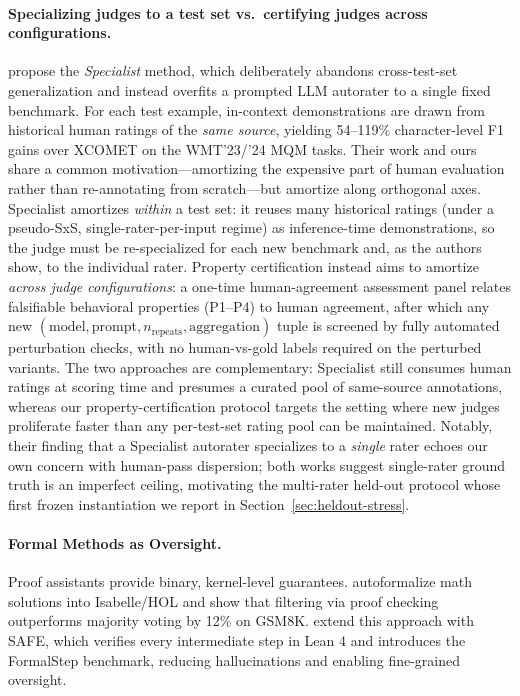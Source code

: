 \documentclass{article}
\begin{document}
\paragraph{Specializing judges to a test set vs.\ certifying judges across configurations.}
\citet{finkelstein2024specialist} propose the \emph{Specialist} method, which deliberately abandons cross-test-set generalization and instead overfits a prompted LLM autorater to a single fixed benchmark.
For each test example, in-context demonstrations are drawn from historical human ratings of the \emph{same source}, yielding 54--119\% character-level F1 gains over \textsc{XCOMET} on the WMT'23/'24 MQM tasks.
Their work and ours share a common motivation---amortizing the expensive part of human evaluation rather than re-annotating from scratch---but amortize along orthogonal axes.
Specialist amortizes \emph{within} a test set: it reuses many historical ratings (under a pseudo-SxS, single-rater-per-input regime) as inference-time demonstrations, so the judge must be re-specialized for each new benchmark and, as the authors show, to the individual rater.
Property certification instead aims to amortize \emph{across judge configurations}: a one-time human-agreement assessment panel relates falsifiable behavioral properties (P1--P4) to human agreement, after which any new $(\text{model},\text{prompt},n_\text{repeats},\text{aggregation})$ tuple is screened by fully automated perturbation checks, with no human-vs-gold labels required on the perturbed variants.
The two approaches are complementary: Specialist still consumes human ratings at scoring time and presumes a curated pool of same-source annotations, whereas our property-certification protocol targets the setting where new judges proliferate faster than any per-test-set rating pool can be maintained.
Notably, their finding that a Specialist autorater specializes to a \emph{single} rater echoes our own concern with human-pass dispersion; both works suggest single-rater ground truth is an imperfect ceiling, motivating the multi-rater held-out protocol whose first frozen instantiation we report in Section~\ref{sec:heldout-stress}.

\paragraph{Formal Methods as Oversight.}
Proof assistants provide binary, kernel-level guarantees. \citet{zhou2024donttrustverify} autoformalize math solutions into Isabelle/HOL and show that filtering via proof checking outperforms majority voting by 12\% on GSM8K. \citet{liu2025safe} extend this approach with SAFE, which verifies every intermediate step in Lean 4 and introduces the FormalStep benchmark, reducing hallucinations and enabling fine-grained oversight.
\end{document}
